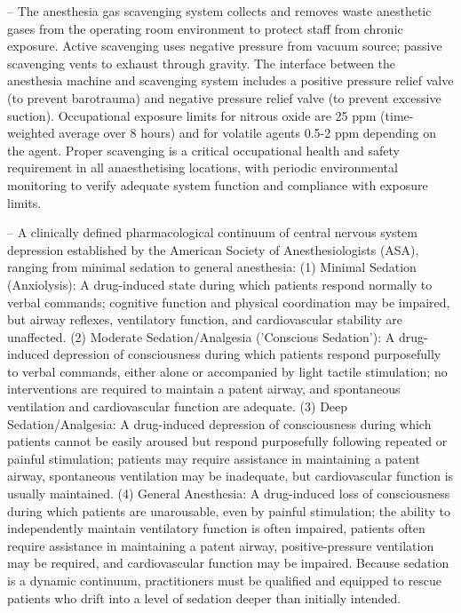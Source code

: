 -- The anesthesia gas scavenging system collects and removes waste anesthetic gases from the operating room environment to protect staff from chronic exposure. Active scavenging uses negative pressure from vacuum source; passive scavenging vents to exhaust through gravity. The interface between the anesthesia machine and scavenging system includes a positive pressure relief valve (to prevent barotrauma) and negative pressure relief valve (to prevent excessive suction). Occupational exposure limits for nitrous oxide are 25 ppm (time-weighted average over 8 hours) and for volatile agents 0.5-2 ppm depending on the agent. Proper scavenging is a critical occupational health and safety requirement in all anaesthetising locations, with periodic environmental monitoring to verify adequate system function and compliance with exposure limits.

-- A clinically defined pharmacological continuum of central nervous system depression established by the American Society of Anesthesiologists (ASA), ranging from minimal sedation to general anesthesia: (1) Minimal Sedation (Anxiolysis): A drug-induced state during which patients respond normally to verbal commands; cognitive function and physical coordination may be impaired, but airway reflexes, ventilatory function, and cardiovascular stability are unaffected. (2) Moderate Sedation/Analgesia ('Conscious Sedation'): A drug-induced depression of consciousness during which patients respond purposefully to verbal commands, either alone or accompanied by light tactile stimulation; no interventions are required to maintain a patent airway, and spontaneous ventilation and cardiovascular function are adequate. (3) Deep Sedation/Analgesia: A drug-induced depression of consciousness during which patients cannot be easily aroused but respond purposefully following repeated or painful stimulation; patients may require assistance in maintaining a patent airway, spontaneous ventilation may be inadequate, but cardiovascular function is usually maintained. (4) General Anesthesia: A drug-induced loss of consciousness during which patients are unarousable, even by painful stimulation; the ability to independently maintain ventilatory function is often impaired, patients often require assistance in maintaining a patent airway, positive-pressure ventilation may be required, and cardiovascular function may be impaired. Because sedation is a dynamic continuum, practitioners must be qualified and equipped to rescue patients who drift into a level of sedation deeper than initially intended.

